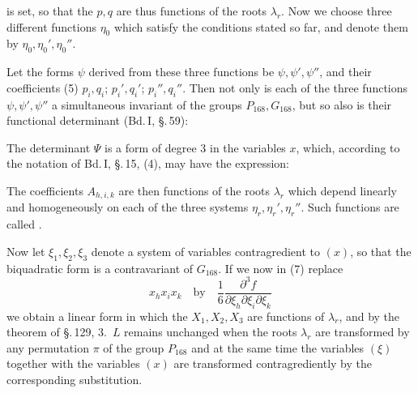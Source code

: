 
is set, so that the $p, q$ are thus functions of the roots $\lambda_r$. Now we choose three different functions $\eta_0$ which satisfy the conditions stated so far, and denote them by $\eta_0, \eta_0', \eta_0''$.

Let the forms $\psi$ derived from these three functions be $\psi, \psi', \psi''$, and their coefficients (5) $p_i, q_i$; $p_i', q_i'$; $p_i'', q_i''$. Then not only is each of the three functions $\psi, \psi', \psi''$ a simultaneous invariant of the groups $P_{168}, G_{168}$, but so also is their functional determinant (Bd.\,I, \S.\,59):

The determinant $\Psi$ is a form of degree 3 in the variables $x$, which, according to the notation of Bd.\,I, \S.\,15, (4), may have the expression:

The coefficients $A_{h,i,k}$ are then functions of the roots $\lambda_r$ which depend linearly and homogeneously on each of the three systems $\eta_r, \eta_r', \eta_r''$. Such functions are called .

Now let $\xi_1, \xi_2, \xi_3$ denote a system of variables contragredient to $(x)$, so that the biquadratic form
is a contravariant of $G_{168}$. If we now in (7) replace
\[
x_h x_i x_k \quad \text{by} \quad \frac{1}{6}\frac{\partial^3 f}{\partial\xi_h\partial\xi_i\partial\xi_k}
\]
we obtain a linear form
in which the $X_1, X_2, X_3$ are functions of $\lambda_r$, and by the theorem of \S.\,129, 3.\ $L$ remains unchanged when the roots $\lambda_r$ are transformed by any permutation $\pi$ of the group $P_{168}$ and at the same time the variables $(\xi)$ together with the variables $(x)$ are transformed contragrediently by the corresponding substitution. %
